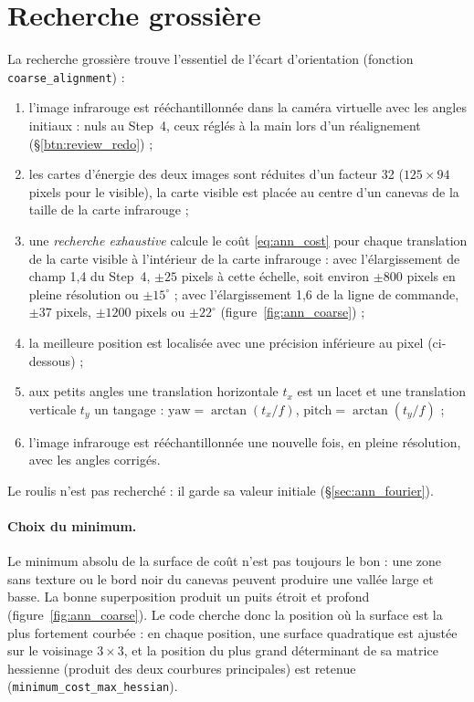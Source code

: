 \documentclass[a4paper,11pt]{report}
\begin{document}
\section{Recherche grossière}\label{sec:ann_coarse}
La recherche grossière trouve l'essentiel de l'écart d'orientation (fonction \texttt{coarse\_alignment}) :
\begin{enumerate}
	\item l'image infrarouge est rééchantillonnée dans la caméra virtuelle avec les angles initiaux : nuls au Step~4, ceux réglés à la main lors d'un réalignement (§\ref{btn:review_redo}) ;
	\item les cartes d'énergie des deux images sont réduites d'un facteur 32 ($125 \times 94$ pixels pour le visible), la carte visible est placée au centre d'un canevas de la taille de la carte infrarouge ;
	\item une \emph{recherche exhaustive} calcule le coût \eqref{eq:ann_cost} pour chaque translation de la carte visible à l'intérieur de la carte infrarouge : avec l'élargissement de champ 1,4 du Step~4, $\pm 25$ pixels à cette échelle, soit environ $\pm 800$ pixels en pleine résolution ou $\pm 15^\circ$ ; avec l'élargissement 1,6 de la ligne de commande, $\pm 37$ pixels, $\pm 1200$ pixels ou $\pm 22^\circ$ (figure~\ref{fig:ann_coarse}) ;
	\item la meilleure position est localisée avec une précision inférieure au pixel (ci-dessous) ;
	\item aux petits angles une translation horizontale $t_x$ est un lacet et une translation verticale $t_y$ un tangage : $\text{yaw} = \arctan(t_x/f)$, $\text{pitch} = \arctan(t_y/f)$ ;
	\item l'image infrarouge est rééchantillonnée une nouvelle fois, en pleine résolution, avec les angles corrigés.
\end{enumerate}
Le roulis n'est pas recherché : il garde sa valeur initiale (§\ref{sec:ann_fourier}).

\paragraph{Choix du minimum.} Le minimum absolu de la surface de coût n'est pas toujours le bon : une zone sans texture ou le bord noir du canevas peuvent produire une vallée large et basse. La bonne superposition produit un puits étroit et profond (figure~\ref{fig:ann_coarse}). Le code cherche donc la position où la surface est la plus fortement courbée : en chaque position, une surface quadratique est ajustée sur le voisinage $3\times3$, et la position du plus grand déterminant de sa matrice hessienne (produit des deux courbures principales) est retenue (\texttt{minimum\_cost\_max\_hessian}).
\end{document}
